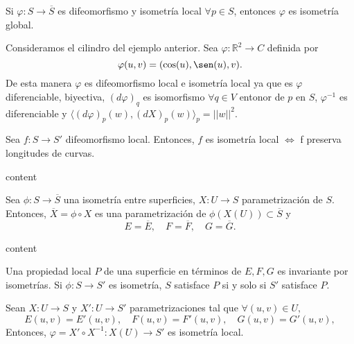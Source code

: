 \begin{obs}
  Si $\varphi : S \to \overline{S}$ es difeomorfismo y isometría local $\forall p \in S$, entonces $\varphi$ es isometría global.
\end{obs}

\begin{ejm}
  Consideramos el cilindro del ejemplo anterior. Sea $\varphi : \mathbb{R}^{2} \to C$ definida por
  \[ 
    \varphi(u, v) = (\cos(u), \sen(u), v).
  \] 
  De esta manera  $\varphi$ es difeomorfismo local e isometría local ya que es $\varphi$ diferenciable, biyectiva, $(d \varphi)_{q}$ es isomorfismo $\forall q \in V$ entonor de $p$ en $S$, $\varphi^{-1}$ es diferenciable y $\langle (d \varphi)_{p}(w){ , }(d X)_{p}(w) \rangle_{p} = ||w||^{2}$.
\end{ejm}

\begin{prop} 
  Sea $f : S \to S'$ difeomorfismo local. Entonces, $ f$ es isometría local $\Leftrightarrow$ f preserva longitudes de curvas.
\end{prop}

\begin{dem}
  content
\end{dem}

\begin{prop}
  Sea $\phi : S \to \overline{S}$ una isometría entre superficies, $X : U \to S$ parametrización de $S$. Entonces, $\overline{X} = \phi \circ X$ es una parametrización de $\phi(X(U)) \subset \overline{S}$ y
  \[ 
    E = \overline{E}, \quad F = \overline{F}, \quad G = \overline{G}. 
  \] 
\end{prop}

\begin{dem}
  content
\end{dem}

\begin{cor}
  Una propiedad local $P$ de una superficie en términos de $E, F, G$ es invariante por isometrías. Si $\phi : S \to S'$ es isometría, $S$ satisface $P$ si y solo si $S'$ satisface $P$.
\end{cor}

\begin{prop}
  Sean $X : U \to S$ y $X' : U \to S'$ parametrizaciones tal que $\forall (u, v) \in U,$
  \[ 
    E(u, v) = E'(u, v), \quad F(u, v) = F'(u, v), \quad G(u, v) = G'(u, v),
  \] 
  Entonces, $\varphi = X' \circ X^{-1} : X(U) \to S'$ es isometría local.
\end{prop}

